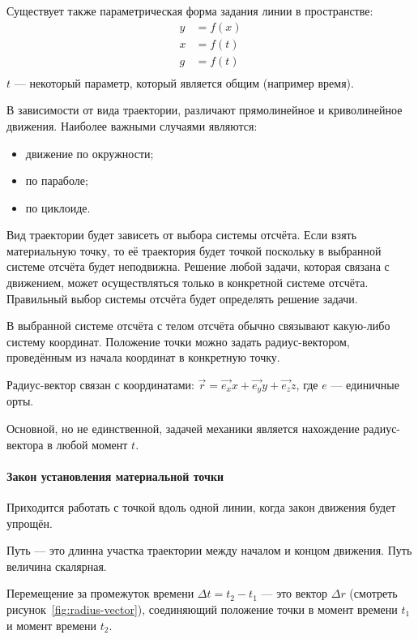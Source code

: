Существует также параметрическая форма задания линии в пространстве:
\begin{align*}
	y & = f(x) \\
	x & = f(t) \\
	g & = f(t) \\
\end{align*}
\( t \) --- некоторый параметр, который является общим (например время).

В зависимости от вида траектории, различают прямолинейное и криволинейное
движения. Наиболее важными случаями являются:
\begin{itemize}
	\item движение по окружности;
	\item по параболе;
	\item по циклоиде.
\end{itemize}

Вид траектории будет зависеть от выбора системы отсчёта. Если взять
материальную точку, то её траектория будет точкой поскольку в выбранной системе
отсчёта будет неподвижна. Решение любой задачи, которая связана с движением,
может осуществляться только в конкретной системе отсчёта. Правильный выбор
системы отсчёта будет определять решение задачи.

В выбранной системе отсчёта с телом отсчёта обычно связывают какую-либо
систему координат. Положение точки можно задать радиус-вектором,
проведённым из начала координат в конкретную точку.

Радиус-вектор связан с координатами: \( \vec{r} = \vec{e_x} x + \vec{e_y} y +
\vec{e_z} z \), где $e$ --- единичные орты.

Основной, но не единственной, задачей механики является нахождение
радиус-вектора в любой момент $t$.

\paragraph{Закон установления материальной точки}
Приходится работать с точкой вдоль одной линии, когда закон движения будет
упрощён.

Путь --- это длинна участка траектории между началом и концом движения. Путь
величина скалярная.

Перемещение за промежуток времени \( \Delta t = t_2 - t_1 \) --- это вектор
$\Delta r$ (смотреть рисунок~\ref{fig:radius-vector}), соединяющий положение
точки в момент времени $t_1$ и момент времени $t_2$.

